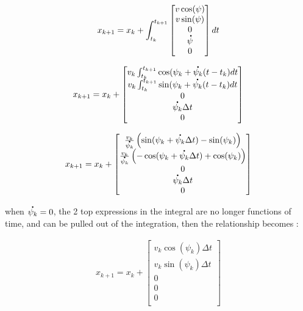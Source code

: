 \documentclass[a4paper,12pt]{article}
\newcommand*{\dt}[1]{%
  \accentset{\mbox{\large\bfseries .}}{#1}}
\begin{document}
  \begin{align}  
  x_{k+1}=x_k + \int_{t_k}^{t_{k+1}} 
  		 \begin{bmatrix}
         v\cos(\psi) \\
         v\sin(\psi) \\
         0 \\
         \dt{\psi} \\
         0 \\
         \end{bmatrix} dt 
  \end{align}
  
  
  
     \begin{align}  
  x_{k+1}=x_k +  
  		 \begin{bmatrix}
         v_k\int_{t_k}^{t_{k+1}}\cos(\psi_k+\dt{\psi_k}(t-t_k) dt \\
         v_k\int_{t_k}^{t_{k+1}}\sin(\psi_k+\dt{\psi_k}(t-t_k) dt\\
         0 \\
         \dt{\psi_k}\Delta t \\
         0 \\
         \end{bmatrix} 
  \end{align} 
  
   \begin{align}  
  x_{k+1}=x_k + 
  		 \begin{bmatrix}
         \frac{v_k}{\dt{\psi_k}}\left(\sin(\psi_k+\dt{\psi_k} \Delta t) -\sin(\psi_k) \right)\\
         \frac{v_k}{\dt{\psi_k}}\left(-\cos(\psi_k+\dt{\psi_k} \Delta t) +\cos(\psi_k) \right)\\
         0 \\
         \dt{\psi_k}\Delta t \\
         0 \\
         \end{bmatrix} 
  \end{align} 
  
when $\dt{\psi_k}=0$, the 2 top expressions in the integral are no longer functions of time, and can be pulled out of the integration, then the relationship becomes :

   \begin{align}  
  x_{k+1}=x_k + 
  		 \begin{bmatrix}
         v_k\cos(\psi_k)\Delta t\\
         v_k\sin(\psi_k)\Delta t\\
         0 \\
         0 \\
         0 \\
         \end{bmatrix} 
  \end{align} 
\end{document}
